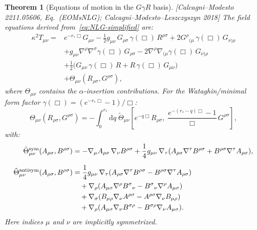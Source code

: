 \documentclass[12pt,a4paper]{article}
\newtheorem{theorem}[proposition]{Theorem}
\theoremstyle{definition}
\theoremstyle{remark}
\newcommand{\dd}{\mathrm{d}}
\newcommand{\fromlit}[1]{\textcolor{blue!70!black}{\textsf{[#1]}}}
\begin{document}
\begin{theorem}[Equations of motion in the $G\gamma R$ basis]
\label{thm:NLG-eom}
\fromlit{Calcagni--Modesto 2211.05606, Eq.~(EOMsNLG);
Calcagni--Modesto--Leszczyszyn 2018}
The field equations derived from~\eqref{eq:NLG-simplified} are:
\begin{equation}\label{eq:NLG-eom}
\begin{split}
  \kappa^2 T_{\mu\nu} = {}
  &e^{-r_*\Box}G_{\mu\nu}
    - \frac{1}{2}g_{\mu\nu}\,G_{\rho\sigma}\,\gamma(\Box)\,R^{\rho\sigma}
    + 2G^\rho{}_{(\mu}\,\gamma(\Box)\,G_{\nu)\rho} \\
  &+ g_{\mu\nu}\nabla^\rho\nabla^\sigma\gamma(\Box)\,G_{\rho\sigma}
    - 2\nabla^\rho\nabla_{(\mu}\gamma(\Box)\,G_{\nu)\rho} \\
  &+ \frac{1}{2}\big(
      G_{\mu\nu}\,\gamma(\Box)\,R
      + R\,\gamma(\Box)\,G_{\mu\nu}
    \big) \\
  &+ \Theta_{\mu\nu}(R_{\rho\sigma}, G^{\rho\sigma}),
\end{split}
\end{equation}
where $\Theta_{\mu\nu}$ contains the $\alpha$-insertion contributions.
For the Wataghin/minimal form factor $\gamma(\Box) = (e^{-r_*\Box}-1)/\Box$:
\begin{equation}\label{eq:Theta-CMN}
  \Theta_{\mu\nu}(R_{\rho\sigma}, G^{\rho\sigma})
  = -\int_0^{r_*}\!\dd q\;
    \tilde{\Theta}_{\mu\nu}\!\left[
      e^{-q\Box}R_{\rho\sigma},\;
      \frac{e^{-(r_*-q)\Box}-1}{\Box}\,G^{\rho\sigma}
    \right],
\end{equation}
with:
\begin{align}
  \tilde{\Theta}_{\mu\nu}^{\mathrm{sym}}(A_{\rho\sigma}, B^{\rho\sigma})
  &= -\nabla_\mu A_{\rho\sigma}\,\nabla_\nu B^{\rho\sigma}
    + \frac{1}{4}g_{\mu\nu}\,
      \nabla_\tau(A_{\rho\sigma}\nabla^\tau B^{\rho\sigma}
      + B^{\rho\sigma}\nabla^\tau A_{\rho\sigma}),
  \label{eq:Theta-sym}\\[6pt]
  \tilde{\Theta}_{\mu\nu}^{\mathrm{antisym}}(A_{\rho\sigma}, B^{\rho\sigma})
  &= \frac{1}{4}g_{\mu\nu}\,
      \nabla_\tau(A_{\rho\sigma}\nabla^\tau B^{\rho\sigma}
      - B^{\rho\sigma}\nabla^\tau A_{\rho\sigma})
  \notag\\
  &\quad + \nabla_\rho(A_{\mu\sigma}\nabla^\rho B^\sigma{}_\nu
    - B^\sigma{}_\nu\nabla^\rho A_{\mu\sigma})
  \notag\\
  &\quad + \nabla_\sigma(B_{\mu\rho}\nabla_\nu A^{\rho\sigma}
    - A^{\rho\sigma}\nabla_\nu B_{\mu\rho})
  \notag\\
  &\quad + \nabla_\rho(A_{\mu\sigma}\nabla_\nu B^{\sigma\rho}
    - B^{\sigma\rho}\nabla_\nu A_{\mu\sigma}).
  \label{eq:Theta-antisym}
\end{align}
Here indices $\mu$ and $\nu$ are implicitly symmetrized.
\end{theorem}
\end{document}
